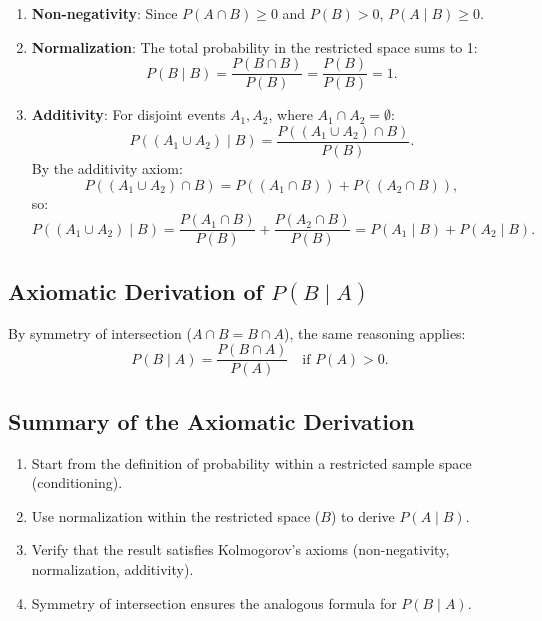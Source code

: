 \documentclass[
  12 pt,
  a4paper,
]{book}
\providecommand{\tightlist}{%
  \setlength{\itemsep}{0pt}\setlength{\parskip}{0pt}}
\numberwithin{equation}{section}
\theoremstyle{plain}      %
\theoremstyle{definition} %
\theoremstyle{remark}     %
\theoremstyle{note}         %
\begin{document}
\begin{enumerate}
\def\labelenumi{\arabic{enumi}.}
\tightlist
\item
  \textbf{Non-negativity}: Since \(P(A \cap B) \geq 0\) and
  \(P(B) > 0\), \(P(A \mid B) \geq 0\).
\item
  \textbf{Normalization}: The total probability in the restricted space
  sums to 1: \[
  P(B \mid B) = \frac{P(B \cap B)}{P(B)} = \frac{P(B)}{P(B)} = 1.
  \]
\item
  \textbf{Additivity}: For disjoint events \(A_1, A_2\), where
  \(A_1 \cap A_2 = \emptyset\): \[
  P((A_1 \cup A_2) \mid B) = \frac{P((A_1 \cup A_2) \cap B)}{P(B)}.
  \] By the additivity axiom: \[
  P((A_1 \cup A_2) \cap B) = P((A_1 \cap B)) + P((A_2 \cap B)),
  \] so: \[
  P((A_1 \cup A_2) \mid B) = \frac{P(A_1 \cap B)}{P(B)} + \frac{P(A_2 \cap B)}{P(B)} = P(A_1 \mid B) + P(A_2 \mid B).
  \]
\end{enumerate}

\hypertarget{axiomatic-derivation-of-pb-mid-a}{%
\subsection{\texorpdfstring{Axiomatic Derivation of
\(P(B \mid A)\)}{Axiomatic Derivation of P(B \textbackslash mid A)}}\label{axiomatic-derivation-of-pb-mid-a}}

By symmetry of intersection (\(A \cap B = B \cap A\)), the same
reasoning applies: \[
P(B \mid A) = \frac{P(B \cap A)}{P(A)} \quad \text{if } P(A) > 0.
\]

\hypertarget{summary-of-the-axiomatic-derivation}{%
\subsection{Summary of the Axiomatic
Derivation}\label{summary-of-the-axiomatic-derivation}}

\begin{enumerate}
\def\labelenumi{\arabic{enumi}.}
\tightlist
\item
  Start from the definition of probability within a restricted sample
  space (conditioning).
\item
  Use normalization within the restricted space (\(B\)) to derive
  \(P(A \mid B)\).
\item
  Verify that the result satisfies Kolmogorov's axioms (non-negativity,
  normalization, additivity).
\item
  Symmetry of intersection ensures the analogous formula for
  \(P(B \mid A)\).
\end{enumerate}
\end{document}

